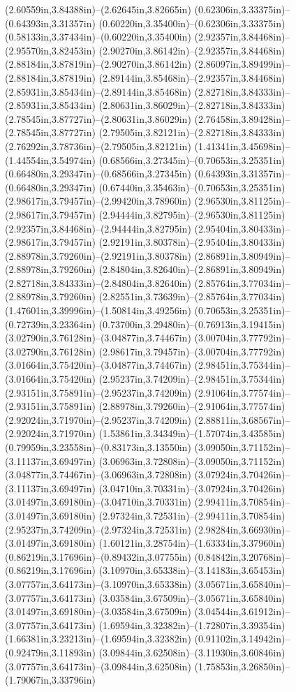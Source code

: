 (2.60559in,3.84388in)--(2.62645in,3.82665in) (0.62306in,3.33375in)--(0.64393in,3.31357in) (0.60220in,3.35400in)--(0.62306in,3.33375in) (0.58133in,3.37434in)--(0.60220in,3.35400in) (2.92357in,3.84468in)--(2.95570in,3.82453in) (2.90270in,3.86142in)--(2.92357in,3.84468in) (2.88184in,3.87819in)--(2.90270in,3.86142in) (2.86097in,3.89499in)--(2.88184in,3.87819in) (2.89144in,3.85468in)--(2.92357in,3.84468in) (2.85931in,3.85434in)--(2.89144in,3.85468in) (2.82718in,3.84333in)--(2.85931in,3.85434in) (2.80631in,3.86029in)--(2.82718in,3.84333in) (2.78545in,3.87727in)--(2.80631in,3.86029in) (2.76458in,3.89428in)--(2.78545in,3.87727in) (2.79505in,3.82121in)--(2.82718in,3.84333in) (2.76292in,3.78736in)--(2.79505in,3.82121in) (1.41341in,3.45698in)--(1.44554in,3.54974in) (0.68566in,3.27345in)--(0.70653in,3.25351in) (0.66480in,3.29347in)--(0.68566in,3.27345in) (0.64393in,3.31357in)--(0.66480in,3.29347in) (0.67440in,3.35463in)--(0.70653in,3.25351in) (2.98617in,3.79457in)--(2.99420in,3.78960in) (2.96530in,3.81125in)--(2.98617in,3.79457in) (2.94444in,3.82795in)--(2.96530in,3.81125in) (2.92357in,3.84468in)--(2.94444in,3.82795in) (2.95404in,3.80433in)--(2.98617in,3.79457in) (2.92191in,3.80378in)--(2.95404in,3.80433in) (2.88978in,3.79260in)--(2.92191in,3.80378in) (2.86891in,3.80949in)--(2.88978in,3.79260in) (2.84804in,3.82640in)--(2.86891in,3.80949in) (2.82718in,3.84333in)--(2.84804in,3.82640in) (2.85764in,3.77034in)--(2.88978in,3.79260in) (2.82551in,3.73639in)--(2.85764in,3.77034in) (1.47601in,3.39996in)--(1.50814in,3.49256in) (0.70653in,3.25351in)--(0.72739in,3.23364in) (0.73700in,3.29480in)--(0.76913in,3.19415in) (3.02790in,3.76128in)--(3.04877in,3.74467in) (3.00704in,3.77792in)--(3.02790in,3.76128in) (2.98617in,3.79457in)--(3.00704in,3.77792in) (3.01664in,3.75420in)--(3.04877in,3.74467in) (2.98451in,3.75344in)--(3.01664in,3.75420in) (2.95237in,3.74209in)--(2.98451in,3.75344in) (2.93151in,3.75891in)--(2.95237in,3.74209in) (2.91064in,3.77574in)--(2.93151in,3.75891in) (2.88978in,3.79260in)--(2.91064in,3.77574in) (2.92024in,3.71970in)--(2.95237in,3.74209in) (2.88811in,3.68567in)--(2.92024in,3.71970in) (1.53861in,3.34349in)--(1.57074in,3.43585in) (0.79959in,3.23558in)--(0.83173in,3.13550in) (3.09050in,3.71152in)--(3.11137in,3.69497in) (3.06963in,3.72808in)--(3.09050in,3.71152in) (3.04877in,3.74467in)--(3.06963in,3.72808in) (3.07924in,3.70426in)--(3.11137in,3.69497in) (3.04710in,3.70331in)--(3.07924in,3.70426in) (3.01497in,3.69180in)--(3.04710in,3.70331in) (2.99411in,3.70854in)--(3.01497in,3.69180in) (2.97324in,3.72531in)--(2.99411in,3.70854in) (2.95237in,3.74209in)--(2.97324in,3.72531in) (2.98284in,3.66930in)--(3.01497in,3.69180in) (1.60121in,3.28754in)--(1.63334in,3.37960in) (0.86219in,3.17696in)--(0.89432in,3.07755in) (0.84842in,3.20768in)--(0.86219in,3.17696in) (3.10970in,3.65338in)--(3.14183in,3.65453in) (3.07757in,3.64173in)--(3.10970in,3.65338in) (3.05671in,3.65840in)--(3.07757in,3.64173in) (3.03584in,3.67509in)--(3.05671in,3.65840in) (3.01497in,3.69180in)--(3.03584in,3.67509in) (3.04544in,3.61912in)--(3.07757in,3.64173in) (1.69594in,3.32382in)--(1.72807in,3.39354in) (1.66381in,3.23213in)--(1.69594in,3.32382in) (0.91102in,3.14942in)--(0.92479in,3.11893in) (3.09844in,3.62508in)--(3.11930in,3.60846in) (3.07757in,3.64173in)--(3.09844in,3.62508in) (1.75853in,3.26850in)--(1.79067in,3.33796in) 